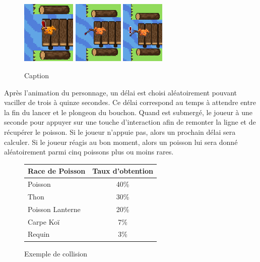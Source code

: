 \documentclass{article}
\begin{document}
        \begin{figure}[h]
            \centering
            \includegraphics[height = 3cm]{peche_action.png}
            \includegraphics[height = 3cm]{peche.png}
            \includegraphics[height = 3cm]{peche_plop.png}
            \caption{Caption}
            \label{fig:enter-label}
        \end{figure}
        
        Après l'animation du personnage, un délai est choisi aléatoirement pouvant vaciller de trois à quinze secondes. Ce délai correspond au temps à attendre entre la fin du lancer et le plongeon du bouchon. Quand est submergé, le joueur à une seconde pour appuyer sur une touche d'interaction afin de remonter la ligne et de récupérer le poisson. Si le joueur n'appuie pas, alors un prochain délai sera calculer. Si le joueur réagis au bon moment, alors un poisson lui sera donné aléatoirement parmi cinq poissons plus ou moins rares. 
        
        \begin{figure} 
        \begin{tabular}{|l|c|}
            Race de Poisson & Taux d'obtention \\
            \hline
            Poisson          &  40\% \\
            Thon             &  30\% \\
            Poisson Lanterne &  20\% \\
            Carpe Koï        &   7\% \\
            Requin           &   3\% \\
        \end{tabular}
            
            \centering
            \caption{Exemple de collision}
            \label{fig:poissons}
        \end{figure}
\end{document}
